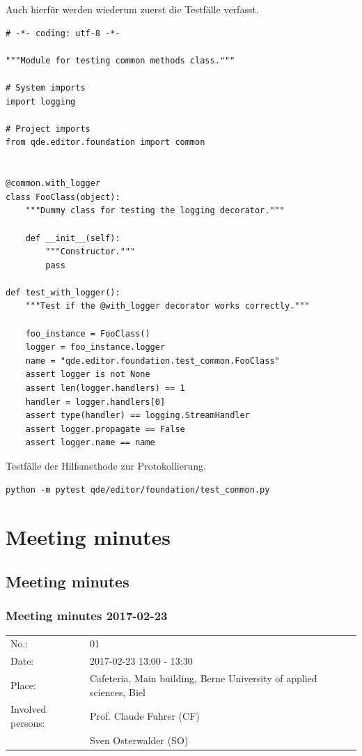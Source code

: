 \documentclass[10pt, openright, notitlepage]{scrreprt}
\begin{document}
Auch hierfür werden wiederum zuerst die Testfälle verfasst.

\begin{listing}[H]
\begin{verbatim}
# -*- coding: utf-8 -*-

"""Module for testing common methods class."""

# System imports
import logging

# Project imports
from qde.editor.foundation import common


@common.with_logger
class FooClass(object):
    """Dummy class for testing the logging decorator."""

    def __init__(self):
        """Constructor."""
        pass

def test_with_logger():
    """Test if the @with_logger decorator works correctly."""

    foo_instance = FooClass()
    logger = foo_instance.logger
    name = "qde.editor.foundation.test_common.FooClass"
    assert logger is not None
    assert len(logger.handlers) == 1
    handler = logger.handlers[0]
    assert type(handler) == logging.StreamHandler
    assert logger.propagate == False
    assert logger.name == name
\end{verbatim}
\caption{\label{fig:editor-common-logging-test}
Testfälle der Hilfsmethode zur Protokollierung.}
\end{listing}

\begin{verbatim}
python -m pytest qde/editor/foundation/test_common.py
\end{verbatim}
\section{Meeting minutes}
\label{sec:org31519ce}
\subsection{Meeting minutes}
\label{sec:org3ae94ed}

\subsubsection{Meeting minutes 2017-02-23}
\label{sec:org091389e}

\begin{center}
\begin{tabular}{ll}
No.: & 01\\
Date: & 2017-02-23 13:00 - 13:30\\
Place: & Cafeteria, Main building, Berne University of applied sciences, Biel\\
Involved persons: & Prof. Claude Fuhrer (CF)\\
 & Sven Osterwalder (SO)\\
\end{tabular}
\end{center}
\end{document}
